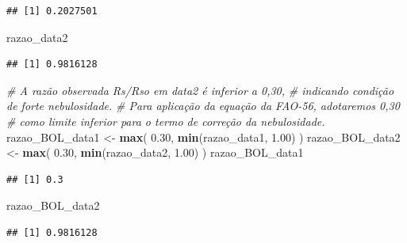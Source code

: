 \documentclass[
]{article}
\newenvironment{Shaded}{\begin{snugshade}}{\end{snugshade}}
\newcommand{\CommentTok}[1]{\textcolor[rgb]{0.56,0.35,0.01}{\textit{#1}}}
\newcommand{\FloatTok}[1]{\textcolor[rgb]{0.00,0.00,0.81}{#1}}
\newcommand{\FunctionTok}[1]{\textcolor[rgb]{0.13,0.29,0.53}{\textbf{#1}}}
\newcommand{\NormalTok}[1]{#1}
\newcommand{\OtherTok}[1]{\textcolor[rgb]{0.56,0.35,0.01}{#1}}
\begin{document}
\begin{verbatim}
## [1] 0.2027501
\end{verbatim}

\begin{Shaded}
\begin{Highlighting}[]
\NormalTok{razao\_data2}
\end{Highlighting}
\end{Shaded}

\begin{verbatim}
## [1] 0.9816128
\end{verbatim}

\begin{Shaded}
\begin{Highlighting}[]
\CommentTok{\# A razão observada Rs/Rso em data2 é inferior a 0,30,}
\CommentTok{\# indicando condição de forte nebulosidade.}
\CommentTok{\# Para aplicação da equação da FAO{-}56, adotaremos 0,30}
\CommentTok{\# como limite inferior para o termo de correção da nebulosidade.}
\NormalTok{razao\_BOL\_data1 }\OtherTok{\textless{}{-}} \FunctionTok{max}\NormalTok{(}
  \FloatTok{0.30}\NormalTok{,}
  \FunctionTok{min}\NormalTok{(razao\_data1, }\FloatTok{1.00}\NormalTok{)}
\NormalTok{)}
\NormalTok{razao\_BOL\_data2 }\OtherTok{\textless{}{-}} \FunctionTok{max}\NormalTok{(}
  \FloatTok{0.30}\NormalTok{,}
  \FunctionTok{min}\NormalTok{(razao\_data2, }\FloatTok{1.00}\NormalTok{)}
\NormalTok{)}
\NormalTok{razao\_BOL\_data1}
\end{Highlighting}
\end{Shaded}

\begin{verbatim}
## [1] 0.3
\end{verbatim}

\begin{Shaded}
\begin{Highlighting}[]
\NormalTok{razao\_BOL\_data2}
\end{Highlighting}
\end{Shaded}

\begin{verbatim}
## [1] 0.9816128
\end{verbatim}
\end{document}
